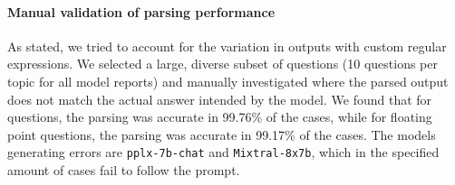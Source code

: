 \paragraph*{Manual validation of parsing performance}

As stated, we tried to account for the variation in outputs with custom regular expressions.
We selected a large, diverse subset of questions (10 questions per topic for all model reports) and manually investigated where the parsed output does not match the actual answer intended by the model.
We found that for  questions, the parsing was accurate in 99.76\% of the cases, while for floating point questions, the parsing was accurate in 99.17\% of the cases.
The models generating errors are \texttt{pplx-7b-chat} and \texttt{Mixtral-8x7b}, which in the specified amount of cases fail to follow the prompt.
